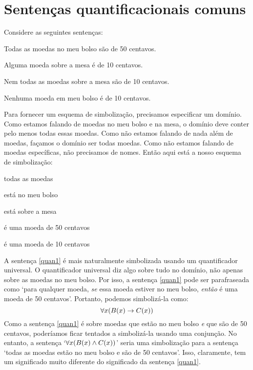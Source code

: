 \section{Sentenças quantificacionais comuns}
Considere as seguintes sentenças:
	\begin{earg}
		\item[\ex{quan1}] Todas as moedas no meu bolso são de 50 centavos.
		\item[\ex{quan2}] Alguma moeda sobre a mesa é de 10 centavos.
		\item[\ex{quan3}] Nem todas as moedas sobre a mesa são de 10 centavos.
		\item[\ex{quan4}] Nenhuma moeda em meu bolso é de 10 centavos.
	\end{earg}
Para fornecer um esquema de simbolização, precisamos especificar um domínio.
Como estamos falando de moedas no meu bolso e na mesa, o domínio deve conter pelo menos todas essas moedas.
Como não estamos falando de nada além de moedas, façamos o domínio ser todas moedas.
Como não estamos falando de moedas específicas, não precisamos de nomes.
Então aqui está a nosso esquema de simbolização:
	\begin{center}
	\begin{ekey}
		\item[\text{domínio}] todas as moedas
		\item[\atom{B}{x}]  está no meu bolso
		\item[\atom{M}{x}]  está sobre a mesa
		\item[\atom{C}{x}]  é uma moeda de 50 centavos
		\item[\atom{D}{x}]  é uma moeda de 10 centavos
	\end{ekey}
	\end{center}
A sentença \ref{quan1} é mais naturalmente simbolizada usando um quantificador universal.
O quantificador universal diz algo sobre tudo no domínio, não apenas sobre as moedas no meu bolso.
Por isso, a sentença \ref{quan1} pode ser parafraseada como `para qualquer moeda, \emph{se} essa moeda estiver no meu bolso, \emph{então} é uma moeda de 50 centavos'.
Portanto, podemos simbolizá-la como:
$$\forall x(\mathord{B}(x) \rightarrow \mathord{C}(x))$$
Como a sentença \ref{quan1} é sobre moedas que estão no meu bolso \emph{e} que são de 50 centavos, poderíamos ficar tentados a simbolizá-la usando uma conjunção.
No entanto, a sentença `$\forall x(\mathord{B}(x) \wedge \mathord{C}(x))$' seria uma simbolização para a sentença `todas as moedas estão no meu bolso e são de 50 centavos'. Isso, claramente, tem um significado muito diferente do significado da sentença \ref{quan1}.
